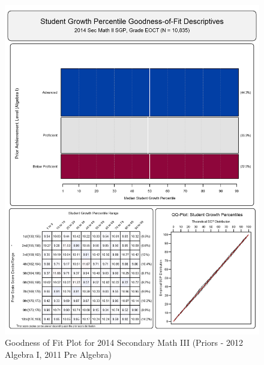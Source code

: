 \documentclass[12pt]{article}
\begin{document}
\begin{figure}[htbp]
\centering
\includegraphics{../img/Goodness_of_Fit/SEC_MATH_II.2014/2014_SEC_MATH_II_EOCT;2012_ALGEBRA_I_EOCT;2011_PRE_ALGEBRA_EOCT.png}
\caption{Goodness of Fit Plot for 2014 Secondary Math III (Priors - 2012
Algebra I, 2011 Pre Algebra)}
\end{figure}
\end{document}
